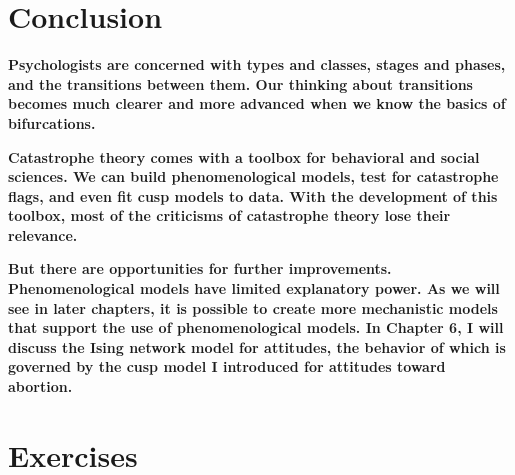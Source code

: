 \documentclass[
  letterpaper,
]{scrbook}
\begin{document}
\hypertarget{conclusion}{%
\section{Conclusion}\label{conclusion}}

\textbf{Psychologists are concerned with types and classes, stages and
phases, and the transitions between them. Our thinking about transitions
becomes much clearer and more advanced when we know the basics of
bifurcations.}

\textbf{Catastrophe theory comes with a toolbox for behavioral and
social sciences. We can build phenomenological models, test for
catastrophe flags, and even fit cusp models to data. With the
development of this toolbox, most of the criticisms of catastrophe
theory lose their relevance.}

\textbf{But there are opportunities for further improvements.
Phenomenological models have limited explanatory power. As we will see
in later chapters, it is possible to create more mechanistic models that
support the use of phenomenological models. In Chapter 6, I will discuss
the Ising network model for attitudes, the behavior of which is governed
by the cusp model I introduced for attitudes toward abortion.}

\hypertarget{exercises-2}{%
\section{Exercises}\label{exercises-2}}
\end{document}
